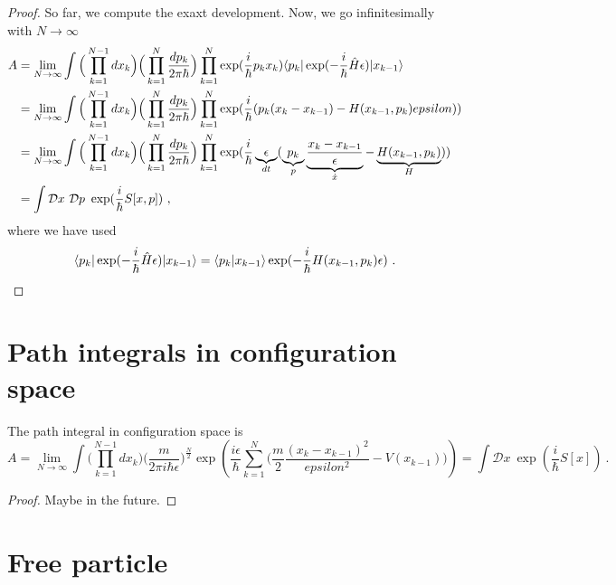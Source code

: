 \begin{proof}
        So far, we compute the exaxt development. Now, we go infinitesimally with $N \rightarrow \infty$
        \begin{equation*}
        \begin{aligned}
            A & = \lim_{N \rightarrow \infty} \int \Big ( \prod_{k=1}^{N-1} dx_k \Big) \Big ( \prod_{k=1}^{N} \frac{dp_k}{2 \pi \hbar} \Big) \prod_{k=1}^{N} \exp(\frac{i}{\hbar} p_k x_k) \langle p_k\vert \exp(- \frac{i}{\hbar} \hat H \epsilon) \vert x_{k-1}\rangle \\ & = \lim_{N \rightarrow \infty} \int \Big ( \prod_{k=1}^{N-1} dx_k \Big) \Big ( \prod_{k=1}^{N} \frac{dp_k}{2 \pi \hbar} \Big) \prod_{k=1}^{N} \exp(\frac{i}{\hbar} (p_k (x_k - x_{k-1}) - H(x_{k-1}, p_k) epsilon )) \\ & = \lim_{N \rightarrow \infty} \int \Big ( \prod_{k=1}^{N-1} dx_k \Big) \Big ( \prod_{k=1}^{N} \frac{dp_k}{2 \pi \hbar} \Big) \prod_{k=1}^{N} \exp(\frac{i}{\hbar} \underbrace{\epsilon}_{dt} (\underbrace{p_k}_p \underbrace{\frac{x_k-x_{k-1}}{\epsilon}}_{\dot x} - \underbrace{H(x_{k-1}, p_k)}_{H} )) \\ & = \int \mathcal D x ~ \mathcal D p ~ \exp(\frac{i}{\hbar} S[x,p]) ~,
        \end{aligned}
        \end{equation*}
        where we have used
        \begin{equation*}
            \langle p_k\vert \exp(- \frac{i}{\hbar} \hat H \epsilon) \vert x_{k-1}\rangle = \langle p_k\vert x_{k-1}\rangle \exp(- \frac{i}{\hbar} H (x_{k-1}, p_k) \epsilon) ~.
        \end{equation*}
    \end{proof}

\chapter{Path integrals in configuration space}

    The path integral in configuration space is 
    \begin{equation*}
        A = \lim_{N \rightarrow \infty} \int \Big (\prod_{k=1}^{N-1} d x_k \Big ) \Big (\frac{m}{2 \pi i \hbar \epsilon} \Big )^{\frac{N}{2}} \exp(\frac{i \epsilon}{\hbar} \sum_{k=1}^{N} \Big (\frac{m}{2} \frac{(x_k - x_{k-1})^2}{epsilon^2} - V(x_{k-1})\Big )) = \int \mathcal D x ~ \exp(\frac{i}{\hbar} S[x]) ~.
    \end{equation*}
    \begin{proof}
        Maybe in the future.
    \end{proof}
\chapter{Free particle}